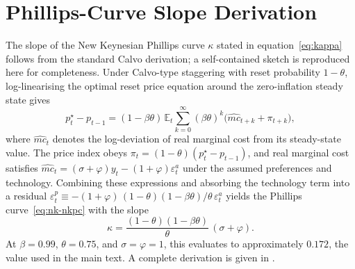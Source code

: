 \section{Phillips-Curve Slope Derivation}
\label{app:proofs}

The slope of the New Keynesian Phillips curve $\kappa$ stated in
equation~\eqref{eq:kappa} follows from the standard Calvo derivation; a
self-contained sketch is reproduced here for completeness. Under
Calvo-type staggering with reset probability $1-\theta$, log-linearising
the optimal reset price equation around the zero-inflation steady state
gives
\begin{equation}
  p_{t}^{\star}-p_{t-1}
  =(1-\beta\theta)\,\mathbb{E}_{t}
    \sum_{k=0}^{\infty}(\beta\theta)^{k}
    \bigl(\widehat{mc}_{t+k}+\pi_{t+k}\bigr),
  \label{eq:reset-price}
\end{equation}
where $\widehat{mc}_{t}$ denotes the log-deviation of real marginal cost
from its steady-state value. The price index obeys
$\pi_{t}=(1-\theta)(p_{t}^{\star}-p_{t-1})$, and real marginal cost
satisfies $\widehat{mc}_{t}=(\sigma+\varphi)y_{t}-(1+\varphi)\varepsilon_{t}^{a}$
under the assumed preferences and technology. Combining these
expressions and absorbing the technology term into a residual
$\varepsilon_{t}^{p}\equiv-(1+\varphi)\,(1-\theta)(1-\beta\theta)/\theta\,\varepsilon_{t}^{a}$
yields the Phillips curve~\eqref{eq:nk-nkpc} with the slope
\begin{equation}
  \kappa
  =\frac{(1-\theta)(1-\beta\theta)}{\theta}\,(\sigma+\varphi).
\end{equation}
At $\beta=0.99$, $\theta=0.75$, and $\sigma=\varphi=1$, this evaluates
to approximately $0.172$, the value used in the main text. A complete
derivation is given in \citet[][Chapter 3, eq.~(20)]{Gali2008}.
